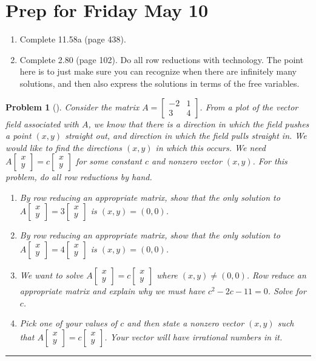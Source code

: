 \documentclass[letterpaper,oneside]{book}%
\let\oldmarginpar\marginpar
\renewcommand\marginpar[1]{\-\oldmarginpar{\raggedright\footnotesize #1}}
\theoremstyle{plain}
\theoremstyle{box}
\theoremstyle{problem}
\newtheorem{problemnum}{Problem}[chapter]
\newtheorem*{hwenum*}{Home Work Practice}
\newenvironment{problem}[1][]{\begin{problemnum}[#1]}{\end{problemnum}\nopagebreak\hrule\bigskip}
\newenvironment{hw*}[1][]{\begin{hwenum*}[#1]}{\end{hwenum*}\nopagebreak\hrule\bigskip}
\newcommand{\bvec}[1]{\begin{bmatrix} #1 \end{bmatrix}}
\begin{document}
\section{Prep for Friday May 10}
\begin{hw*}
\begin{enumerate}
\item 
Complete 11.58a (page 438).
 \item Complete 2.80 (page 102).  Do all row reductions with technology.  The point here is to just make sure you can recognize when there are infinitely many solutions, and then also express the solutions in terms of the free variables.
\end{enumerate}
\end{hw*}


\begin{problem}
 Consider the matrix $A=\bvec{-2&1\\3&4}$. From a plot of the vector field associated with $A$, we know that there is a direction in which the field pushes a point $(x,y)$ straight out, and direction in which the field pulls straight in.  
\marginpar{\texttt{[image: 241-image1]}}
We would like to find the directions $(x,y)$ in which this occurs. We need $A\bvec{x\\y}=c\bvec{x\\y}$ for some constant $c$ and nonzero vector $(x,y)$. For this problem, do all row reductions by hand.
\begin{enumerate}
 \item By row reducing an appropriate matrix, show that the only solution to $A\bvec{x\\y}=3\bvec{x\\y}$ is $(x,y)=(0,0)$. 
 \item By row reducing an appropriate matrix, show that the only solution to $A\bvec{x\\y}=4\bvec{x\\y}$ is $(x,y)=(0,0)$. 
 \item We want to solve $A\bvec{x\\y}=c\bvec{x\\y}$ where $(x,y)\neq (0,0)$. Row reduce an appropriate matrix and explain why we must have $c^2-2c-11=0$. Solve for $c$.
 \item Pick one of your values of $c$ and then state a nonzero vector $(x,y)$ such that $A\bvec{x\\y}=c\bvec{x\\y}$. Your vector will have irrational numbers in it. 
\end{enumerate}

\end{problem}
\end{document}
